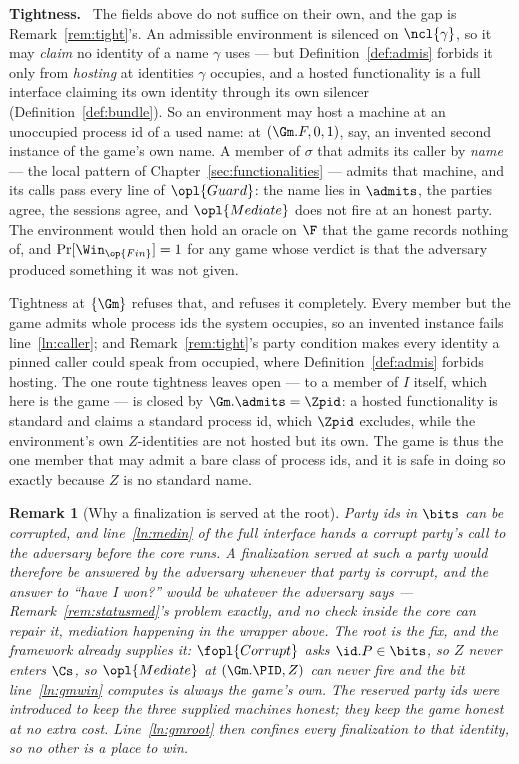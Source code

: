 \documentclass[10pt,oneside,openany]{book}
\newcommand{\heading}[1]{\medskip\par\noindent\textcolor{accent}{\textbf{#1.}}\ }
\theoremstyle{accentdef}
\newtheorem{remark}[definition]{Remark}
\theoremstyle{accentplain}
\begin{document}
\heading{Tightness} The fields above do not suffice on their own, and the gap is
Remark~\ref{rem:tight}'s. An admissible environment is silenced on $\ncl{\gamma}$, so it may
\emph{claim} no identity of a name $\gamma$ uses --- but Definition~\ref{def:admis} forbids it only
from \emph{hosting} at identities $\gamma$ occupies, and a hosted functionality is a full interface
claiming its own identity through its own silencer (Definition~\ref{def:bundle}). So an environment may
host a machine at an unoccupied process id of a used name: at $(\Gm.F,0,1)$, say, an invented second
instance of the game's own name. A member of $\sigma$ that admits its caller by \emph{name} --- the
local pattern of Chapter~\ref{sec:functionalities} --- admits that machine, and its calls pass every
line of $\opl{Guard}$: the name lies in $\admits$, the parties agree, the sessions agree, and
$\opl{Mediate}$ does not fire at an honest party. The environment would then hold an oracle on $\F$
that the game records nothing of, and $\Pr[\Win_{\op{Fin}}] = 1$ for any game whose verdict is that the adversary
produced something it was not given.

Tightness at $\{\Gm\}$ refuses that, and refuses it completely. Every member but the game admits whole
process ids the system occupies, so an invented instance fails line~\ref{ln:caller}; and
Remark~\ref{rem:tight}'s party condition makes every identity a pinned caller could speak from
occupied, where Definition~\ref{def:admis} forbids hosting. The one route tightness leaves open --- to
a member of $I$ itself, which here is the game --- is closed by $\Gm.\admits = \Zpid$: a hosted
functionality is standard and claims a standard process id, which $\Zpid$ excludes, while the
environment's own $Z$-identities are not hosted but its own. The game is thus the one member that may
admit a bare class of process ids, and it is safe in doing so exactly because $Z$ is no standard name.

\begin{remark}[Why a finalization is served at the root]\label{rem:finroot}
Party ids in $\bits$ can be corrupted, and line~\ref{ln:medin} of the full interface hands a corrupt
party's call to the adversary \emph{before} the core runs. A finalization served at such a party
would therefore be answered by the adversary whenever that party is corrupt, and the answer to
``have I won?'' would be whatever the adversary says --- Remark~\ref{rem:statusmed}'s problem exactly,
and no check inside the core can repair it, mediation happening in the wrapper above.
The root is the fix, and the framework already supplies it: $\fopl{Corrupt}$ asks
$\id.P \in \bits$, so $Z$ never enters $\Cs$, so $\opl{Mediate}$ at $(\Gm.\PID,Z)$ can never fire and
the bit line~\ref{ln:gmwin} computes is always the game's own. The reserved party ids were introduced
to keep the three supplied machines honest; they keep the game honest at no extra cost.
Line~\ref{ln:gmroot} then confines every finalization to that identity, so no other is a place to
win.
\end{remark}
\end{document}
